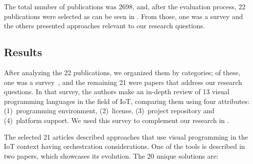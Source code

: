 The total number of publications was 2698, and, after the evaluation process, 22 publications were selected as can be seen in . From those, one was a survey and the others presented approaches relevant to our research questions.

\subsection{Results}\label{sec:slr_results}

After analyzing the 22 publications, we organized them by categories; of these, one was a survey~\cite{survey_vpl_iot}, and the remaining 21 were papers that address our research questions. In that survey, the authors make an in-depth review of 13 visual programming languages in the field of IoT, comparing them using four attributes: (1)~programming environment, (2)~license, (3)~project repository and (4)~platform support. We used this survey to complement our research in .

The selected 21 articles described approaches that use visual programming in the IoT context having orchestration considerations. One of the tools is described in two papers, which showcases its evolution. The 20 unique solutions are:

